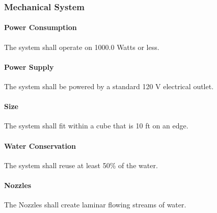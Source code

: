 \subsubsection{Mechanical System}

\paragraph{Power Consumption}
The system shall operate on 1000.0 Watts or less.

\paragraph{Power Supply}
The system shall be powered by a standard 120 V electrical outlet. 

\paragraph{Size}
The system shall fit within a cube that is 10 ft on an edge.

\paragraph{Water Conservation}
The system shall reuse at least 50\% of the water. %


\paragraph{Nozzles}
The Nozzles shall create laminar flowing streams of water.



